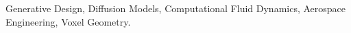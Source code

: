 \documentclass[journal]{IEEEtran}
\begin{document}
\begin{IEEEkeywords}
Generative Design, Diffusion Models, Computational Fluid Dynamics, Aerospace Engineering, Voxel Geometry.
\end{IEEEkeywords}




\par





\end{document}
